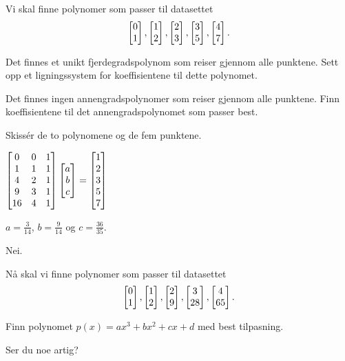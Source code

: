 \begin{oppgave}
Vi skal finne polynomer som passer til datasettet 
$$\begin{bmatrix} 0 \\ 1 \end{bmatrix}, \begin{bmatrix} 1 \\ 2 \end{bmatrix}, \begin{bmatrix} 2 \\ 3 \end{bmatrix},\begin{bmatrix} 3 \\ 5 \end{bmatrix},\begin{bmatrix} 4 \\ 7 \end{bmatrix}.$$

\begin{punkt}
Det finnes et unikt fjerdegradspolynom  som reiser gjennom alle punktene. Sett opp et ligningssystem for koeffisientene til dette polynomet. 
\end{punkt}

\begin{punkt}
Det finnes ingen annengradspolynomer som reiser gjennom alle punktene. Finn koeffisientene til det annengradspolynomet som passer best.
\end{punkt}

\begin{punkt}
Skissér de to polynomene og de fem punktene. 
\end{punkt}

\end{oppgave}

\begin{losning}
\begin{punkt}
$
\begin{bmatrix}
0 & 0 & 1\\
1 & 1 & 1\\
4 & 2 & 1\\
9 & 3 & 1\\
16 & 4 & 1
\end{bmatrix}\begin{bmatrix} a \\ b \\ c \end{bmatrix}=\begin{bmatrix}
1\\
2\\
3\\
5\\
7
\end{bmatrix}$
\end{punkt}

\begin{punkt}
$a=\frac{3}{14}$, $b=\frac{9}{14}$ og $c=\frac{36}{35}$.
\end{punkt}

\begin{punkt}
Nei.
\end{punkt}

\end{losning}


\begin{oppgave}
Nå skal vi finne polynomer som passer til datasettet 
$$\begin{bmatrix} 0 \\ 1 \end{bmatrix}, \begin{bmatrix} 1 \\ 2 \end{bmatrix}, \begin{bmatrix} 2 \\ 9 \end{bmatrix},\begin{bmatrix} 3 \\ 28 \end{bmatrix},\begin{bmatrix} 4 \\ 65 \end{bmatrix}.$$ 
\begin{punkt}
Finn polynomet $p(x)=ax^3+bx^2+cx+d$ med best tilpasning.
\end{punkt}

\begin{punkt}
Ser du noe artig?
\end{punkt}

\end{oppgave}

